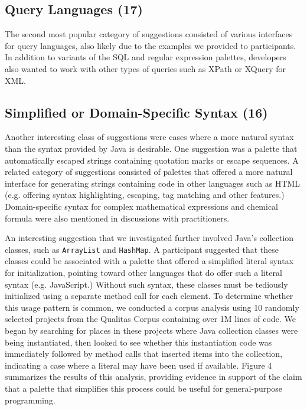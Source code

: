\documentclass[10pt, conference, compsocconf]{IEEEtran}
\begin{document}
\subsection{Query Languages (17)}
The second most popular category of suggestions consisted of various interfaces for query languages, also likely due to the examples we provided to participants. In addition to variants of the SQL and regular expression palettes, developers also wanted to work with other types of queries such as XPath or XQuery for XML.

\subsection{Simplified or Domain-Specific Syntax (16)}
Another interesting class of suggestions were cases where a more natural syntax than the syntax provided by Java is desirable. One suggestion was a palette that automatically escaped strings containing quotation marks or escape sequences. A related category of suggestions consisted of palettes that offered a more natural interface for generating strings containing code in other languages such as HTML (e.g. offering syntax highlighting, escaping,  tag matching and other features.) Domain-specific syntax for complex mathematical expressions and chemical formula were also mentioned in discussions with practitioners.

An interesting suggestion that we investigated further involved Java's collection classes, such as \verb|ArrayList| and \verb|HashMap|. A participant suggested that these classes could be associated with a palette that offered a simplified literal syntax for initialization, pointing toward other languages that do offer such a literal syntax (e.g. JavaScript.) Without such syntax, these classes must be tediously initialized using a separate method call for each element. To determine whether this usage pattern is common, we conducted a corpus analysis using 10 randomly selected projects from the Qualitas Corpus \cite{QualitasCorpus:APSEC:2010} containing over 1M lines of code. We began by searching for places in these projects where Java collection classes were being instantiated, then looked to see whether this instantiation code was immediately followed by method calls that inserted items into the collection, indicating a case where a literal may have been used if available. Figure 4 summarizes the results of this analysis, providing evidence in support of the claim that a palette that simplifies this process could be useful for general-purpose programming.
\end{document}

